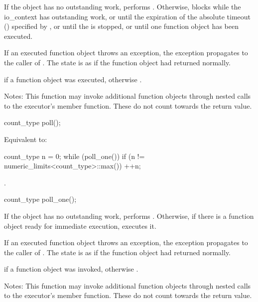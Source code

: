 \begin{itemdescr}
\pnum
\effects If the  object has no outstanding work, performs . Otherwise, blocks while the io_context has outstanding work, or until the expiration of the absolute timeout () specified by , or until the  is stopped, or until one function object has been executed.

\pnum
If an executed function object throws an exception, the exception propagates to the caller of . The  state is as if the function object had returned normally.

\pnum
\returns {} if a function object was executed, otherwise .

\pnum
Notes: This function may invoke additional function objects through nested calls to the  executor's  member function. These do not count towards the return value.
\end{itemdescr}

\begin{itemdecl}
count_type poll();
\end{itemdecl}

\begin{itemdescr}
\pnum
\effects Equivalent to: 
\begin{codeblock}
count_type n = 0;
while (poll_one())
  if (n != numeric_limits<count_type>::max())
    ++n;
\end{codeblock}


\pnum
\returns {}.
\end{itemdescr}

\begin{itemdecl}
count_type poll_one();
\end{itemdecl}

\begin{itemdescr}
\pnum
\effects If the  object has no outstanding work, performs . Otherwise, if there is a function object ready for immediate execution, executes it.

\pnum
If an executed function object throws an exception, the exception propagates to the caller of . The  state is as if the function object had returned normally.

\pnum
\returns {} if a function object was invoked, otherwise .

\pnum
Notes: This function may invoke additional function objects through nested calls to the  executor's  member function. These do not count towards the return value.
\end{itemdescr}

